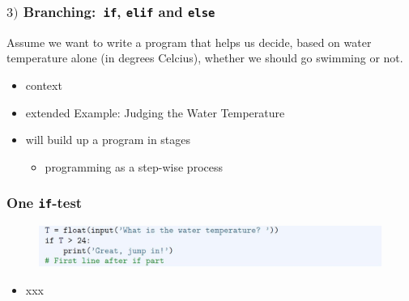 \documentclass[english,14pt]{beamer}
\begin{document}
\begin{frame}[fragile]

\frametitle{$3)$ Branching:~\texttt{if}, \texttt{elif} and \texttt{else}}


Assume we want to write a program that helps us decide, based on water temperature
alone (in degrees Celcius), whether we should go swimming or not.

\begin{itemize}
	\item context
	\item extended Example: Judging the Water Temperature %
	\item will build up a program in stages
	\begin{itemize}
		\item programming as a step-wise process
	\end{itemize}
\end{itemize}

\end{frame}


\begin{frame}[fragile]

\frametitle{One \texttt{if}-test}

\begin{figure}[ht]
	\centering
	\includegraphics[width=\textwidth]{figures/LLp68a}
\end{figure}

\begin{itemize}
	\item xxx
\end{itemize}

\end{frame}

\end{document}
